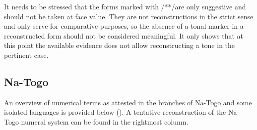 It needs to be stressed that the forms marked with /**/are only suggestive and should not be taken at face value. They are not reconstructions in the strict sense and only serve for comparative purposes, so the absence of a tonal marker in a reconstructed form should not be considered meaningful. It only shows that at this point the available evidence does not allow reconstructing a tone in the pertinent case.

\clearpage
\subsection{Na-Togo}%
An overview of numerical terms as attested in the branches of Na-Togo and some isolated languages is provided below (). A tentative reconstruction of the Na-Togo numeral system can be found in the rightmost column. 

